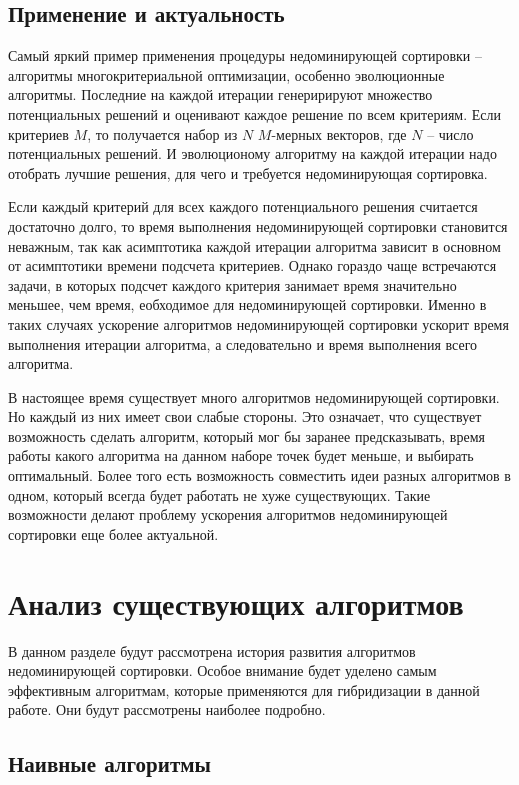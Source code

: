 \subsection{Применение и актуальность}

Самый яркий пример применения процедуры недоминирующей сортировки -- алгоритмы многокритериальной оптимизации, особенно
эволюционные алгоритмы. Последние на каждой итерации генеририруют множество потенциальных решений и оценивают каждое 
решение по всем критериям. Если критериев $M$, то получается набор из $N$ $M$-мерных векторов, где $N$ -- число потенциальных 
решений. И эволюционому алгоритму на каждой итерации надо отобрать лучшие решения, для чего и требуется недоминирующая
сортировка.

Если каждый критерий для всех каждого потенциального решения считается достаточно долго, то время выполнения недоминирующей
сортировки становится неважным, так как асимптотика каждой итерации алгоритма зависит в основном от асимптотики времени 
подсчета критериев. Однако гораздо чаще встречаются задачи, в которых подсчет каждого критерия занимает время значительно 
меньшее, чем время, еобходимое для недоминирующей сортировки. Именно в таких случаях ускорение алгоритмов недоминирующей 
сортировки ускорит время выполнения итерации алгоритма, а следовательно и время выполнения всего алгоритма.

В настоящее время существует много алгоритмов недоминирующей сортировки. Но каждый из них имеет свои слабые стороны. Это 
означает, что существует возможность сделать алгоритм, который мог бы заранее предсказывать, время работы какого алгоритма 
на данном наборе точек будет меньше, и выбирать оптимальный. Более того есть возможность совместить идеи разных алгоритмов
в одном, который всегда будет работать не хуже существующих. Такие возможности делают проблему ускорения алгоритмов недоминирующей
сортировки еще более актуальной.

\section{Анализ существующих алгоритмов}

В данном разделе будут рассмотрена история развития алгоритмов недоминирующей сортировки. Особое внимание будет
уделено самым эффективным алгоритмам, которые применяются для гибридизации в данной работе. Они будут рассмотрены 
наиболее подробно.

\subsection{Наивные алгоритмы}

